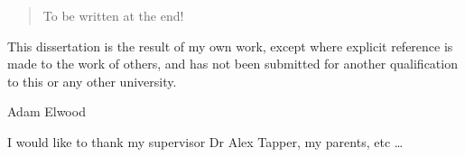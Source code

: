 
\begin{abstract}%
  To be written at the end!
\end{abstract}


\begin{declaration}
  This dissertation is the result of my own work, except where explicit
  reference is made to the work of others, and has not been submitted
  for another qualification to this or any other university.
  \vspace*{1cm}
  \begin{flushright}
    Adam Elwood
  \end{flushright}
\end{declaration}


\begin{acknowledgements}
  I would like to thank my supervisor Dr Alex Tapper, my parents, etc
  \dots
\end{acknowledgements}


%
%
\tableofcontents


